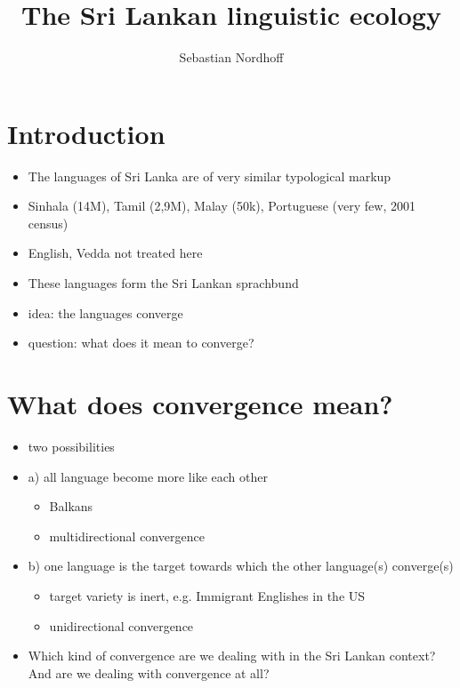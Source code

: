 \documentclass[a4paper,utf8]{article}
\title{The Sri Lankan linguistic ecology}
\author{Sebastian Nordhoff}
\begin{document}
\maketitle

\section{Introduction}
\begin{itemize}
 \item The languages of Sri Lanka are of very similar typological markup
 \item Sinhala (14M), Tamil (2,9M), Malay (50k), Portuguese (very few, 2001 census)
 \item English, Vedda not treated here\
 \item These languages form the Sri Lankan sprachbund \citep{Bakker2006}
 \item idea: the languages converge
 \item question: what does it mean to converge?
\end{itemize}

\section{What does convergence mean?}
\begin{itemize}
 \item two possibilities
 \item a) all language become more like each other 
  \begin{itemize}
  \item Balkans
  \item multidirectional convergence
  \end{itemize}
 \item b) one language is the target towards which the other language(s) converge(s) 
  \begin{itemize}
  \item target variety is inert, e.g. Immigrant Englishes in the US
  \item  unidirectional convergence
  \end{itemize}
 \item Which kind of convergence are we dealing with in the Sri Lankan context? And are we dealing with convergence at all?
\end{itemize}
 
\end{document}

